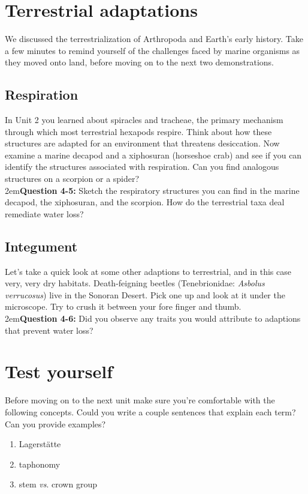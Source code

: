 \documentclass[letterpaper, 11pt]{article}
\begin{document}
\section{Terrestrial adaptations}
We discussed the terrestrialization of Arthropoda and Earth's early history. Take a few minutes to remind yourself of the challenges faced by marine organisms as they moved onto land, before moving on to the next two demonstrations.

\subsection{Respiration}
In Unit 2 you learned about spiracles and tracheae, the primary mechanism through which most terrestrial hexapods respire. Think about how these structures are adapted for an environment that threatens desiccation. Now examine a marine decapod and a xiphosuran (horseshoe crab) and see if you can identify the structures associated with respiration. Can you find analogous structures on a scorpion or a spider?\\

\hangindent2em\textbf{Question 4-5:} Sketch the respiratory structures you can find in the marine decapod, the xiphosuran, and the scorpion. How do the terrestrial taxa deal remediate water loss? 

\subsection{Integument}
Let's take a quick look at some other adaptions to terrestrial, and in this case very, very dry habitats. Death-feigning beetles (Tenebrionidae: \textit{Asbolus verrucosus}) live in the Sonoran Desert. Pick one up and look at it under the microscope. Try to crush it between your fore finger and thumb.\\

\hangindent2em\textbf{Question 4-6:} Did you observe any traits you would attribute to adaptions that prevent water loss?


\section*{Test yourself}
Before moving on to the next unit make sure you're comfortable with the following concepts. Could you write a couple sentences that explain each term? Can you provide examples?

\begin{enumerate} 
\item{Lagerst{\"a}tte} 
\item{taphonomy}  
\item {stem \textit{vs}. crown group}
\end{enumerate}
\end{document}
